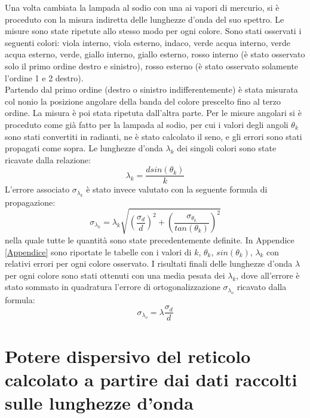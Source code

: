 \documentclass{article}
\begin{document}
        Una volta cambiata la lampada al sodio con una ai vapori di mercurio, si è proceduto con la misura indiretta delle lunghezze d'onda del suo spettro.
        Le misure sono state ripetute allo stesso modo per ogni colore. Sono stati osservati i seguenti colori: viola interno, viola esterno, indaco, 
        verde acqua interno, verde acqua esterno, verde, giallo interno, giallo esterno, rosso interno (è stato osservato solo il primo ordine destro e sinistro), 
        rosso esterno (è stato osservato solamente l'ordine 1 e 2 destro). \\
        Partendo dal primo ordine (destro o sinistro indifferentemente) è stata misurata col nonio la posizione angolare della banda del colore prescelto
        fino al terzo ordine. La misura è poi stata ripetuta dall'altra parte. Per le misure angolari si è proceduto come già fatto per la lampada al sodio,
        per cui i valori degli angoli $\theta_k$ sono stati convertiti in radianti, ne è stato calcolato il seno, e gli errori sono stati propagati come sopra.
        Le lunghezze d'onda $\lambda_k$ dei singoli colori sono state ricavate dalla relazione: \[\lambda_k = \frac{d sin(\theta_k)}{k}\]
        L'errore associato $\sigma_{\lambda_k}$ è stato invece valutato con la seguente formula di propagazione:
        \[\sigma_{\lambda_k} = \lambda_k \sqrt{(\frac{\sigma_d}{d})^2 + (\frac{\sigma_{\theta_k}}{tan(\theta_k)})^2}\]
        nella quale tutte le quantità sono state precedentemente definite. 
        In Appendice \ref{Appendice} sono riportate le tabelle con i valori di $k$, $\theta_k$, $sin(\theta_k)$, $\lambda_k$ con relativi errori per ogni colore osservato. 
        I risultati finali delle lunghezze d'onda $\lambda$ per ogni colore sono stati ottenuti con una media pesata dei $\lambda_k$, 
        dove all'errore è stato sommato in quadratura l'errore di ortogonalizzazione $\sigma_{\lambda_o}$ ricavato dalla formula:
        \[\sigma_{\lambda_o} = \lambda \frac{\sigma_d}{d} \]
        

    \section{Potere dispersivo del reticolo calcolato a partire dai dati raccolti sulle lunghezze d'onda}
        
\end{document}
